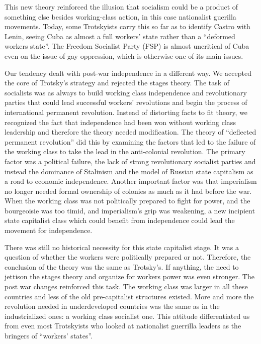 This new theory reinforced the illusion that socialism could be a product of something else besides working-class action, in this case nationalist guerilla movements. Today, some Trotskyists carry this so far as to identify Castro with Lenin, seeing Cuba as almost a full workers' state rather than a ``deformed workers state''. The Freedom Socialist Party (FSP) is almost uncritical of Cuba even on the issue of gay oppression, which is otherwise one of its main issues.

Our tendency dealt with post-war independence in a different way. We accepted the core of Trotsky's strategy and rejected the stages theory. The task of socialists was as always to build working class independence and revolutionary parties that could lead successful workers' revolutions and begin the process of international permanent revolution. Instead of distorting facts to fit theory, we recognized the fact that independence had been won without working class leadership and therefore the theory needed modification. The theory of ``deflected permanent revolution'' did this by examining the factors that led to the failure of the working class to take the lead in the anti-colonial revolution. The primary factor was a political failure, the lack of strong revolutionary socialist parties and instead the dominance of Stalinism and the model of Russian state capitalism as a road to economic independence. Another important factor was that imperialism no longer needed formal ownership of colonies as much as it had before the war. When the working class was not politically prepared to fight for power, and the bourgeoisie was too timid, and imperialism's grip was weakening, a new incipient state capitalist class which could benefit from independence could lead the movement for independence.

There was still no historical necessity for this state capitalist stage. It was a question of whether the workers were politically prepared or not. Therefore, the conclusion of the theory was the same as Trotsky's. If anything, the need to jettison the stages theory and organize for workers power was even stronger. The post war changes reinforced this task. The working class was larger in all these countries and less of the old pre-capitalist structures existed. More and more the revolution needed in underdeveloped countries was the same as in the industrialized ones: a working class socialist one. This attitude differentiated us from even most Trotskyists who looked at nationalist guerrilla leaders as the bringers of ``workers' states''.

